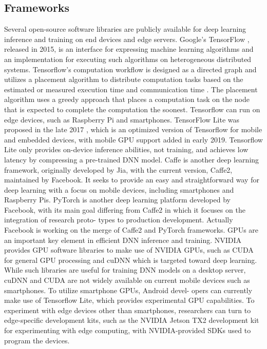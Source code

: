 \subsection{Frameworks}
Several open-source software libraries are publicly available for deep learning inference and training on end devices and edge servers. Google’s TensorFlow \cite{tensorflow2015-whitepaper}, released in 2015, is an interface for expressing machine learning algorithms and an implementation for executing such algorithms on heterogeneous distributed systems. Tensorflow's computation workflow is designed as a directed graph and utilizes a placement algorithm to distribute computation tasks based on the estimated or measured execution time and communication time \cite{abadi2016tensorflow}. The placement algorithm uses a greedy approach that places a computation task on the node that is expected to complete the computation the soonest. Tensorflow can run on edge devices, such as Raspberry Pi and smartphones. TensorFlow Lite was proposed in the late 2017 \cite{tensorflowlite}, which is an optimized version of Tensorflow for mobile and embedded devices, with mobile GPU support added in early 2019. 
Tensorflow Lite only provides on-device inference abilities, not training, and achieves low latency by compressing a pre-trained DNN model.
Caffe \cite{Caffe} is another deep learning framework, originally developed by Jia, with the current version, Caffe2, maintained by Facebook. It seeks to provide an easy and straightforward way for deep learning with a focus on mobile devices, including smartphones and Raspberry Pis. PyTorch \cite{NEURIPS2019_9015} is another deep learning platform developed by Facebook, with its main goal differing from Caffe2 in which it focuses on the integration of research proto- types to production development. Actually Facebook is working on the merge of Caffe2 and PyTorch frameworks.
GPUs are an important key element in efficient DNN inference and training. NVIDIA provides GPU software libraries to make use of NVIDIA GPUs, such as CUDA \cite{CUDA} for general GPU processing and cuDNN \cite{cuDNN} which is targeted toward deep learning. While such libraries are useful for training DNN models on a desktop server, cuDNN and CUDA are not widely available on current mobile devices such as smartphones. To utilize smartphone GPUs, Android devel- opers can currently make use of Tensorflow Lite, which provides experimental GPU capabilities. To experiment with edge devices other than smartphones, researchers can turn to edge-specific development kits, such as the NVIDIA Jetson TX2 development kit for experimenting with edge computing, with NVIDIA-provided SDKs used to program the devices.



